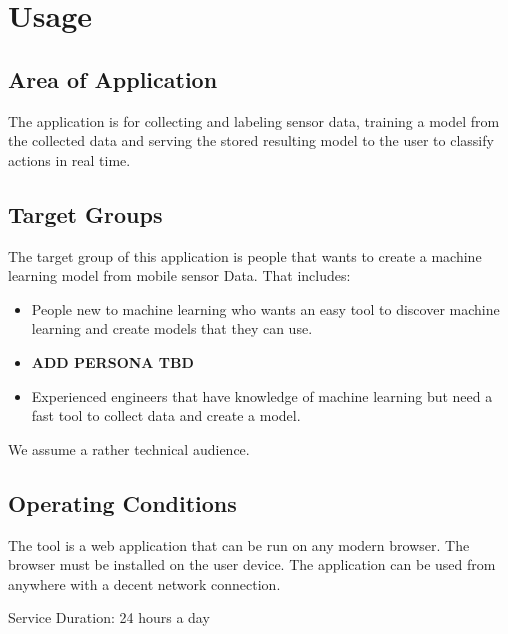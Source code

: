 \section{Usage}
\subsection{Area of Application}
The application is for collecting and labeling sensor data, training a model from the collected data and serving the stored resulting model to the user to classify actions in real time.

\subsection{Target Groups}
The target group of this application is people that wants to create a machine learning model from mobile sensor Data.
That includes: 
\begin{itemize}
    \item People new to machine learning who wants an easy tool to discover machine learning and create models that they can use.
    \item \textbf{ADD PERSONA TBD}
    \item Experienced engineers that have knowledge of machine learning but need a fast tool to collect data and create a model.
\end{itemize}
We assume a rather technical audience.

\subsection{Operating Conditions}
The tool is a web application that can be run on any modern browser. The browser must be installed on the user device. The application can be used from anywhere with a decent network connection.

Service Duration: 24 hours a day